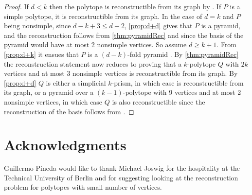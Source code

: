 \documentclass[a4paper]{amsart}
\theoremstyle{definition}
\theoremstyle{remark}
\begin{document}
\begin{proof} If $d< k$ then the polytope is reconstructible from its graph by \cite[Thm.~4.6]{NevPinUgo17}. If $P$ is a simple polytope, it is reconstructible from its graph.  In the case of $d=k$ and $P$ being nonsimple, since $d-k+3\le d-2$, \cref{prop:d+d} gives that $P$ is a pyramid, and the reconstruction follows from  \cref{thm:pyramidRec}  and \cite[Thm.~4.6]{NevPinUgo17} since the basis of the pyramid would have at most 2 nonsimple vertices. So assume $d\ge k+1$. From \cref{prop:d+k} it ensues that $P$ is a $(d-k)$-fold pyramid .  By \cref{thm:pyramidRec} the reconstruction statement now reduces to proving that a $k$-polytope $Q$ with $2k$ vertices and at most 3 nonsimple vertices is reconstructible from its graph. By \cref{prop:d+d} $Q$ is either a simplicial $k$-prism, in which case is reconstructible from its graph, or a pyramid over a $(k-1)$-polytope with 9 vertices and at most 2 nonsimple vertices, in which case $Q$ is also reconstructible since the reconstruction of the basis follows from \cite[Thm.~4.6]{NevPinUgo17} .  
\end{proof}

\section{Acknowledgments}
Guillermo Pineda would like to thank Michael Joswig for the hospitality at the Technical University of Berlin and for suggesting looking at the reconstruction problem for polytopes with small number of vertices.
\end{document}
